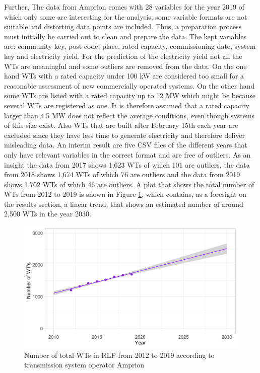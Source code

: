 \documentclass[a4paper,11pt]{article}
\begin{document}
Further, The data from Amprion comes with 28 variables for the year 2019 of which only some are interesting for the analysis, some variable formats are not suitable and distorting data points are included. Thus, a preparation process must initially be carried out to clean and prepare the data. The kept variables are: community key, post code, place, rated capacity, commissioning date, system key and electricity yield. For the prediction of the electricity yield not all the WTs are meaningful and some outliers are removed from the data. On the one hand WTs with a rated capacity under 100 kW are considered too small for a reasonable assessment of new commercially operated systems. On the other hand some WTs are listed with a rated capacity up to 12 MW which might be because several WTs are registered as one. It is therefore assumed that a rated capacity larger than 4.5 MW does not reflect the average conditions, even though systems of this size exist. Also WTs that are built after February 15th each year are excluded since they have less time to generate electricity and therefore deliver misleading data. An interim result are five CSV files of the different years that only have relevant variables in the correct format and are free of outliers. As an insight the data from 2017 shows 1,623 WTs of which 101 are outliers, the data from 2018 shows 1,674 WTs of which 76 are outliers and the data from 2019 shows 1,702 WTs of which 46 are outliers. A plot that shows the total number of WTs from 2012 to 2019 is shown in Figure \ref{fig:yearswts}, which contains, as a foresight on the results section, a linear trend, that shows an estimated number of around 2,500 WTs in the year 2030.
\begin{figure}

{\centering \includegraphics[width=1\linewidth]{data/Amprion/results_of_analysis/year_wts} 

}

\caption{Number of total WTs in RLP from 2012 to 2019 according to transmission system operator Amprion}\label{fig:yearswts}
\end{figure}
\end{document}
